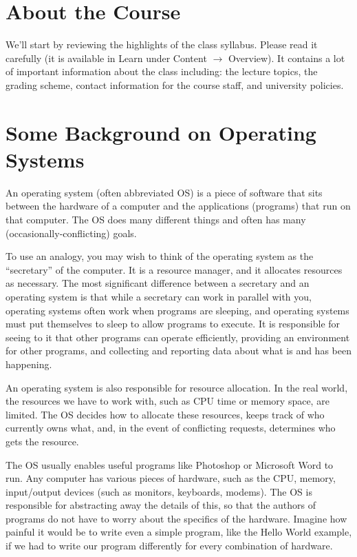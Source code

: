 




\section*{About the Course}
We'll start by reviewing the highlights of the class syllabus. Please read it carefully (it is available in Learn under Content $\rightarrow$ Overview). It contains a lot of important information about the class including: the lecture topics, the grading scheme, contact information for the course staff, and university policies.

\section*{Some Background on Operating Systems}

An operating system (often abbreviated OS) is a piece of software that sits between the hardware of a computer and the applications (programs) that run on that computer. The OS does many different things and often has many (occasionally-conflicting) goals.

To use an analogy, you may wish to think of the operating system as the ``secretary'' of the computer.  It is a resource manager, and it allocates resources as necessary.  The most significant difference between a secretary and an operating system is that while a secretary can work in parallel with you, operating systems often work when programs are sleeping, and operating systems must put themselves to sleep to allow programs to execute. It is responsible for seeing to it that other programs can operate efficiently, providing an environment for other programs, and collecting and reporting data about what is and has been happening.

An operating system is also responsible for resource allocation. In the real world, the resources we have to work with, such as CPU time or memory space, are limited. The OS decides how to allocate these resources, keeps track of who currently owns what, and, in the event of conflicting requests, determines who gets the resource.

The OS usually enables useful programs like Photoshop or Microsoft Word to run. Any computer has various pieces of hardware, such as the CPU, memory, input/output devices (such as monitors, keyboards, modems). The OS is responsible for abstracting away the details of this, so that the authors of programs do not have to worry about the specifics of the hardware. Imagine how painful it would be to write even a simple program, like the Hello World example, if we had to write our program differently for every combination of hardware.

